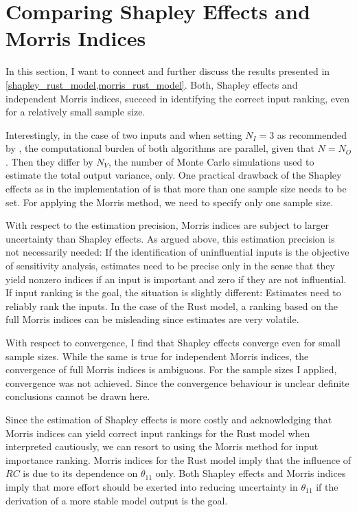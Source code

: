\section{Comparing Shapley Effects and Morris Indices} \label{comparison}

In this section, I want to connect and further discuss the results presented in \cref{shapley_rust_model,morris_rust_model}. Both, Shapley effects and independent Morris indices, succeed in identifying the correct input ranking, even for a relatively small sample size.

Interestingly, in the case of two inputs and when setting $N_I = 3$ as recommended
by \citet{SNS16}, the computational burden of both algorithms are parallel, given that $N = N_O$. Then they differ by $N_V$, the number of Monte Carlo simulations used to estimate the total output variance, only. One practical drawback
of the Shapley effects as in the implementation of \citet{SNS16} is that more than one sample size needs to be set. For applying the Morris method, we need to specify only one sample size.

With respect to the estimation precision, Morris indices are subject to larger uncertainty
than Shapley effects. As argued above, this estimation precision is not necessarily needed: If
the identification of uninfluential inputs is the objective of sensitivity analysis, estimates need to be precise
only in the sense that they yield nonzero indices if an input is important and zero if they
are not influential. If input ranking is the goal, the situation is slightly different: Estimates need to reliably rank the inputs.
In the case of the Rust model, a ranking based on the full Morris indices can be misleading since estimates are very volatile.

With respect to convergence, I find that Shapley effects converge even for small sample sizes. While the same is true for independent Morris indices, the convergence of full Morris indices is ambiguous. For the sample sizes I applied, convergence was not achieved. Since the convergence behaviour is unclear definite conclusions cannot be drawn here.

Since the estimation of Shapley effects is more costly and acknowledging that Morris
indices can yield correct input rankings for the Rust model when interpreted cautiously, we can resort to using the Morris
method for input importance ranking. Morris indices for the Rust model imply that the influence of $RC$ is due to its dependence on $\theta_{11}$ only. Both Shapley effects and Morris indices imply that more effort should be exerted into reducing uncertainty in $\theta_{11}$ if the derivation of a more stable model output is the goal.

